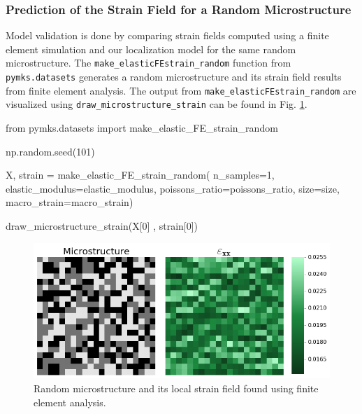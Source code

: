 \documentclass{bmcart}
\newcommand{\fimage}
{\fcolorbox{outcolor}{white}}
{}
\begin{document}
    \subsubsection{Prediction of the Strain Field for a Random
Microstructure}\label{prediction-of-the-strain-field-for-a-random-microstructure}

Model validation is done by comparing strain fields computed using a
finite element simulation and our localization model for the same random
microstructure. The \texttt{make\_elasticFEstrain\_random} function from
\texttt{pymks.datasets} generates a random microstructure and its
strain field results from finite element analysis. The output from
\texttt{make\_elasticFEstrain\_random} are visualized using
\texttt{draw\_microstructure\_strain} can be found in Fig.
\ref{fig:drawMicroStrainRandom}.


\begin{_input}
from pymks.datasets import make_elastic_FE_strain_random

np.random.seed(101)

X, strain = make_elastic_FE_strain_random(
    n_samples=1, elastic_modulus=elastic_modulus,
    poissons_ratio=poissons_ratio, size=size,
    macro_strain=macro_strain)

draw_microstructure_strain(X[0] , strain[0])

\end{_input}


\begin{figure}
    \centering
    \includegraphics[scale=.54]{pymks_paper_localization_files/pymks_paper_localization_12_0.png}
    \caption{Random microstructure and its local strain field found using finite element analysis.}
    \label{fig:drawMicroStrainRandom}
\end{figure}
\end{document}

